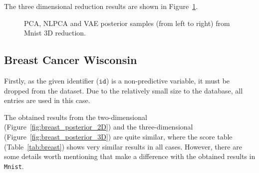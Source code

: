 The three dimensional reduction results are shown in Figure~\ref{fig:mnist_posterior_3D}.
\begin{figure}[h]
  \centering
   \caption{PCA, NLPCA and VAE posterior samples (from left to right) from Mnist 3D reduction.}\label{fig:mnist_posterior_3D}
\end{figure}

\subsection{Breast Cancer Wisconsin}

Firstly, as the given identifier (\(\texttt{id}\)) is a non-predictive variable, it must be dropped from the dataset. Due to the relatively small size to the database, all entries are used in this case.

The obtained results from the two-dimensional (Figure~\ref{fig:breast_posterior_2D}) and the three-dimensional (Figure~\ref{fig:breast_posterior_3D}) are quite similar, where the score table (Table~\ref{tab:breast}) shows very similar results in all cases. However, there are some details worth mentioning that make a difference with the obtained results in \texttt{Mnist}.


